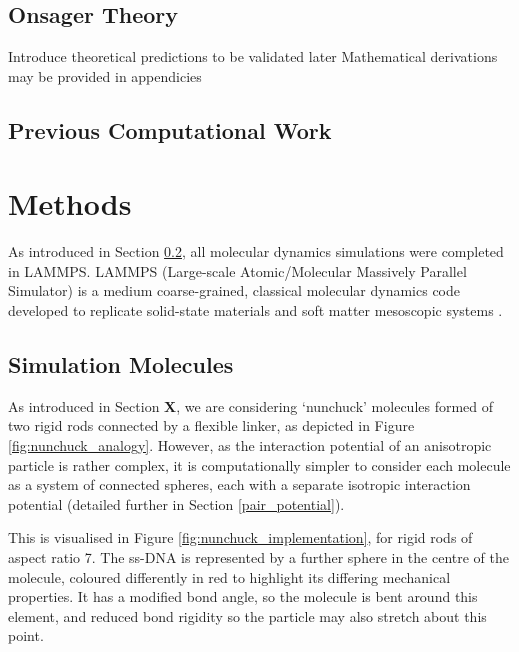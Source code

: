 \documentclass[11pt, a4paper]{article} %
\begin{document}
\subsection{Onsager Theory}
Introduce theoretical predictions to be validated later
Mathematical derivations may be provided in appendicies
\subsection{Previous Computational Work} \label{sec:PrevWork}

\section{Methods}
As introduced in Section \ref{sec:PrevWork}, all molecular dynamics simulations were completed in LAMMPS. LAMMPS (Large-scale Atomic/Molecular Massively Parallel Simulator) is a medium coarse-grained, classical molecular dynamics code developed to replicate  solid-state materials and soft matter mesoscopic systems \cite{Plimpton1995, LAMMPS}.



\subsection{Simulation Molecules}
As introduced in Section \textbf{X}, we are considering `nunchuck' molecules formed of two rigid rods connected by a flexible linker, as depicted in Figure \ref{fig:nunchuck_analogy}. However, as the interaction potential of an anisotropic particle is rather complex, it is computationally simpler to consider each molecule as a system of connected spheres, each with a separate isotropic interaction potential (detailed further in Section \ref{pair_potential}).

This is visualised in Figure \ref{fig:nunchuck_implementation}, for rigid rods of aspect ratio 7. The ss-DNA is represented by a further sphere in the centre of the molecule, coloured differently in red to highlight its differing mechanical properties. It has a modified bond angle, so the molecule is bent around this element, and reduced bond rigidity so the particle may also stretch about this point. 
\end{document}
